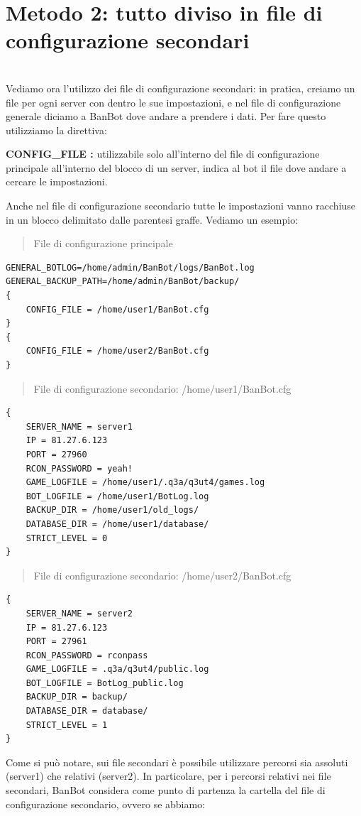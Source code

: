 \documentclass[a4paper]{article}
\begin{document}
\chapter{\textbf{Metodo 2: tutto diviso in file di configurazione secondari}}\\
Vediamo ora l'utilizzo dei file di configurazione secondari: in pratica, creiamo un file per ogni server con dentro le sue impostazioni, e nel file di configurazione generale diciamo a BanBot dove andare a prendere i dati.
Per fare questo utilizziamo la direttiva:
\begin{description}
\item{\textbf{CONFIG\_FILE :}} utilizzabile solo all'interno del file di configurazione principale all'interno del blocco di un server, indica al bot il file dove andare a cercare le impostazioni.
\end{description}
Anche nel file di configurazione secondario tutte le impostazioni vanno racchiuse in un blocco delimitato dalle parentesi graffe.
Vediamo un esempio:
\begin{quote}
File di configurazione principale
\end{quote}
\begin{lstlisting}
GENERAL_BOTLOG=/home/admin/BanBot/logs/BanBot.log
GENERAL_BACKUP_PATH=/home/admin/BanBot/backup/
{
	CONFIG_FILE = /home/user1/BanBot.cfg
}
{
	CONFIG_FILE = /home/user2/BanBot.cfg
}
\end{lstlisting}
\begin{quote}
File di configurazione secondario: /home/user1/BanBot.cfg
\end{quote}
\begin{lstlisting}
{
	SERVER_NAME = server1
	IP = 81.27.6.123
	PORT = 27960
	RCON_PASSWORD = yeah!
	GAME_LOGFILE = /home/user1/.q3a/q3ut4/games.log
	BOT_LOGFILE = /home/user1/BotLog.log
	BACKUP_DIR = /home/user1/old_logs/
	DATABASE_DIR = /home/user1/database/
	STRICT_LEVEL = 0
}
\end{lstlisting}
\begin{quote}
File di configurazione secondario: /home/user2/BanBot.cfg
\end{quote}
\begin{lstlisting}
{
	SERVER_NAME = server2
	IP = 81.27.6.123
	PORT = 27961
	RCON_PASSWORD = rconpass
	GAME_LOGFILE = .q3a/q3ut4/public.log
	BOT_LOGFILE = BotLog_public.log
	BACKUP_DIR = backup/
	DATABASE_DIR = database/
	STRICT_LEVEL = 1
}
\end{lstlisting}
Come si pu\`o notare, sui file secondari \`e possibile utilizzare percorsi sia assoluti (server1) che relativi (server2). In particolare, per i percorsi relativi nei file secondari, BanBot considera come punto di partenza la cartella del file di configurazione secondario, ovvero se abbiamo:
\end{document}
